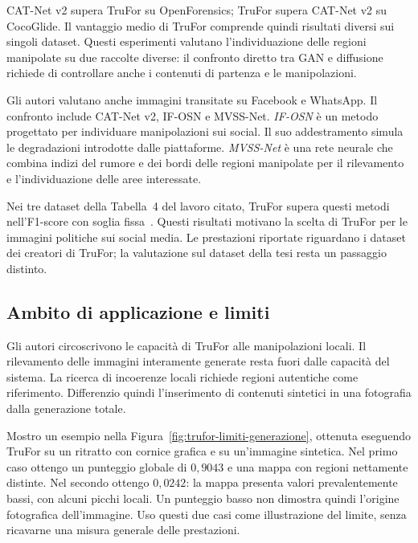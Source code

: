 CAT-Net v2 supera TruFor su OpenForensics; TruFor supera CAT-Net v2 su CocoGlide. Il vantaggio medio di TruFor comprende quindi risultati diversi sui singoli dataset. Questi esperimenti valutano l'individuazione delle regioni manipolate su due raccolte diverse: il confronto diretto tra GAN e diffusione richiede di controllare anche i contenuti di partenza e le manipolazioni.

Gli autori valutano anche immagini transitate su Facebook e WhatsApp. Il confronto include CAT-Net v2, IF-OSN e MVSS-Net. \emph{IF-OSN} è un metodo progettato per individuare manipolazioni sui social. Il suo addestramento simula le degradazioni introdotte dalle piattaforme. \emph{MVSS-Net} è una rete neurale che combina indizi del rumore e dei bordi delle regioni manipolate per il rilevamento e l'individuazione delle aree interessate.

Nei tre dataset della Tabella~4 del lavoro citato, TruFor supera questi metodi nell'F1-score con soglia fissa~\cite{Guillaro_2023_CVPR}. Questi risultati motivano la scelta di TruFor per le immagini politiche sui social media. Le prestazioni riportate riguardano i dataset dei creatori di TruFor; la valutazione sul dataset della tesi resta un passaggio distinto.

\subsection{Ambito di applicazione e limiti}
\label{subsec:background-trufor-limiti}

Gli autori circoscrivono le capacità di TruFor alle manipolazioni locali. Il rilevamento delle immagini interamente generate resta fuori dalle capacità del sistema. La ricerca di incoerenze locali richiede regioni autentiche come riferimento. Differenzio quindi l'inserimento di contenuti sintetici in una fotografia dalla generazione totale.

Mostro un esempio nella Figura~\ref{fig:trufor-limiti-generazione}, ottenuta eseguendo TruFor su un ritratto con cornice grafica e su un'immagine sintetica. Nel primo caso ottengo un punteggio globale di $0{,}9043$ e una mappa con regioni nettamente distinte. Nel secondo ottengo $0{,}0242$: la mappa presenta valori prevalentemente bassi, con alcuni picchi locali. Un punteggio basso non dimostra quindi l'origine fotografica dell'immagine. Uso questi due casi come illustrazione del limite, senza ricavarne una misura generale delle prestazioni.

